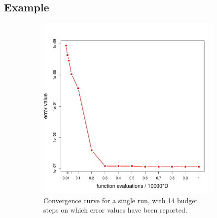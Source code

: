\documentclass[hyperref={pdfpagelabels=false}]{beamer}
\begin{document}
\begin{frame}
\subsection{Example}
%
\begin{figure}
\captionsetup[subfigure]{labelformat=empty}
\centering
\begin{subfigure}{0.46\textwidth}
\centering
\includegraphics[width = \textwidth]{DESConvergence.pdf}
\caption{Convergence curve for a single run, with 14 budget steps on which error values have been reported. }
\label{fig:left}
\end{subfigure}
\begin{subfigure}{0.46\textwidth}
\vspace{-5mm}
\centering

\end{subfigure}
\end{figure}
\end{frame}
\end{document}

